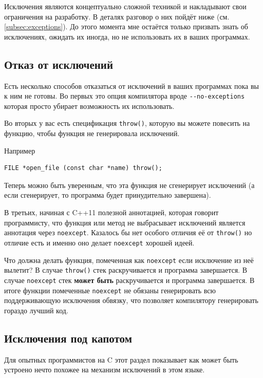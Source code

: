 \documentclass[a4paper,12pt,oneside]{book}
\begin{document}
Исключения являются концептуально сложной техникой и накладывают свои ограничения на разработку. В деталях разговор о них пойдёт ниже (см. \ref{subsec:exceptions}). До этого момента мне остаётся только призвать знать об исключениях, ожидать их иногда, но не использовать их в ваших программах.

\subsection{Отказ от исключений}\label{subsub:basic_noexcept}

Есть несколько способов отказаться от исключений в ваших программах пока вы к ним не готовы. Во первых это опция компилятора вроде \lstinline!--no-exceptions! которая просто убирает возможность их использовать.

Во вторых у вас есть спецификация \lstinline!throw()!, которую вы можете повесить на функцию, чтобы функция не генерировала исключений.

Например

\begin{lstlisting}
FILE *open_file (const char *name) throw();
\end{lstlisting}

Теперь можно быть уверенным, что эта функция не сгенерирует исключений (а если сгенерирует, то программа будет принудительно завершена).

В третьих, начиная с C++11 полезной аннотацией, которая говорит программисту, что функция или метод не выбрасывает исключений является аннотация через \lstinline!noexcept!. Казалось бы нет особого отличия её от \lstinline!throw()! но отличие есть и именно оно делает \lstinline!noexcept! хорошей идеей.

Что должна делать функция, помеченная как \lstinline!noexcept! если исключение из неё вылетит? В случае \lstinline!throw()! стек раскручивается и программа завершается. В случае \lstinline!noexcept! стек \textbf{может быть} раскручивается и программа завершается. В итоге функции помеченные \lstinline!noexcept! не обязаны генерировать всю поддерживающую исключения обвязку, что позволяет компилятору генерировать гораздо лучший код.

\subsection{Исключения под капотом}\label{subsub:deepdiveexc}

Для опытных программистов на C этот раздел показывает как может быть устроено нечто похожее на механизм исключений в этом языке.
\end{document}
